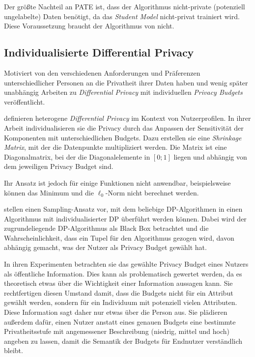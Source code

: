 Der größte Nachteil an PATE ist, dass der Algorithmus nicht-private (potenziell ungelabelte) Daten benötigt, da das \textit{Student Model} nicht-privat trainiert wird. Diese Voraussetzung braucht der Algorithmus von \textcite{abadi:2016} nicht.

\subsection{Individualisierte Differential Privacy}\label{fund-idp}

Motiviert von den verschiedenen Anforderungen und Präferenzen unterschiedlicher Personen an die Privatheit ihrer Daten haben \textcite{alaggan:2016} und wenig später unabhängig \textcite{jorgensen:2015} Arbeiten zu \textit{Differential Privacy} mit individuellen \textit{Privacy Budgets} veröffentlicht.

\textcite{alaggan:2016} definieren heterogene \textit{Differential Privacy} im Kontext von Nutzerprofilen. In ihrer Arbeit individualisieren sie die Privacy durch das Anpassen der Sensitivität der Komponenten mit unterschiedlichen Budgets. Dazu erstellen sie eine \textit{Shrinkage Matrix}, mit der die Datenpunkte multipliziert werden. Die Matrix ist eine Diagonalmatrix, bei der die Diagonalelemente in $[0;1]$ liegen und abhängig von dem jeweiligen Privacy Budget sind.

Ihr Ansatz ist jedoch für einige Funktionen nicht anwendbar, beispielsweise können das Minimum und die $\ell_0$-Norm nicht berechnet werden.

\textcite{jorgensen:2015} stellen einen Sampling-Ansatz vor, mit dem beliebige DP-Algorith\-men in einen Algorithmus mit individualisierter DP überführt werden können. Dabei wird der zugrundeliegende DP-Algorithmus als Black Box betrachtet und die Wahrscheinlichkeit, dass ein Tupel für den Algorithmus gezogen wird, davon abhängig gemacht, was der Nutzer als Privacy Budget gewählt hat.

In ihren Experimenten betrachten sie das gewählte Privacy Budget eines Nutzers als öffentliche Information. Dies kann als problematisch gewertet werden, da es theoretisch etwas über die Wichtigkeit einer Information aussagen kann. Sie rechtfertigen diesen Umstand damit, dass die Budgets nicht für ein Attribut gewählt werden, sondern für ein Individuum mit potenziell vielen Attributen. Diese Information sagt daher nur etwas über die Person aus. Sie plädieren außerdem dafür, einen Nutzer anstatt eines genauen Budgets eine bestimmte Privatheitsstufe mit angemessener Beschreibung (niedrig, mittel und hoch) angeben zu lassen, damit die Semantik der Budgets für Endnutzer verständlich bleibt.

